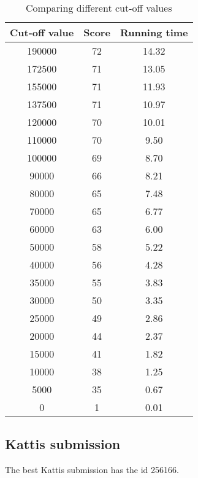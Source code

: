 \begin{table}[h!]
    \centering
    \begin{tabular}{|c|c|c|}
    \hline
    \textbf{Cut-off value} & \textbf{Score} & \textbf{Running time} \\ \hline
    190000 & 72 & 14.32 \\ \hline
    172500 & 71 & 13.05 \\ \hline
    155000 & 71 & 11.93 \\ \hline
    137500 & 71 & 10.97 \\ \hline
    120000 & 70 & 10.01 \\ \hline
    110000 & 70 & 9.50 \\ \hline
    100000 & 69 & 8.70 \\ \hline
    90000  & 66 & 8.21 \\ \hline
    80000  & 65 & 7.48 \\ \hline 
    70000  & 65 & 6.77 \\ \hline   
    60000  & 63 & 6.00 \\ \hline
    50000  & 58 & 5.22 \\ \hline
    40000  & 56 & 4.28 \\ \hline
    35000  & 55 & 3.83 \\ \hline
    30000  & 50 & 3.35 \\ \hline
    25000  & 49 & 2.86 \\ \hline
    20000  & 44 & 2.37 \\ \hline
    15000  & 41 & 1.82 \\ \hline
    10000  & 38 & 1.25 \\ \hline
    5000   & 35 & 0.67 \\ \hline
    0      & 1  & 0.01 \\ \hline
    \end{tabular}
    \caption{Comparing different cut-off values}
    \label{table:cutoff}
\end{table}

\subsection{Kattis submission}
The best Kattis submission has the id 256166.
